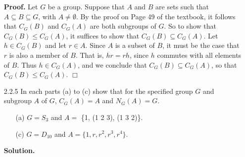 \documentclass[9pt]{article}
\newcommand{\qed}{\hfill \ensuremath{\Box}}
\begin{document}
\begin{enumerate}
      \textbf{Proof.} Let $G$ be a group. Suppose that $A$ and $B$ are sets such
      that $A \subseteq B \subseteq G$, with $A \neq \emptyset$. By the
      proof on Page 49 of the textbook, it follows that $C_G(B)$ and $C_G(A)$
      are both subgroups of $G$. So to show that $C_G(B) \le C_G(A)$, it
      suffices to show that $C_G(B) \subseteq C_G(A)$. Let $h \in C_G(B)$ and
      let $r \in A$. Since $A$ is a subset of $B$, it must be the case that
      $r$ is also a member of $B$. That is, $hr = rh$, since $h$ commutes with
      all elements of $B$. Thus $h \in C_G(A)$, and we conclude that
      $C_G(B) \subseteq C_G(A)$, so that $C_G(B) \le C_G(A)$. \qed
   \item[2.2.5]   In each parts (a) to (c) show that for the specified group $G$
                  and subgroup $A$ of $G$, $C_G(A) = A$ and $N_G(A) = G$.
                  \begin{enumerate}
                     \item[(a)]  $G = S_3$ and $A = $ \{1, (1 2 3), (1 3 2)\}.
                     \item[(c)]  $G = D_{10}$ and $A = \{1, r, r^2, r^3, r^4\}$.
                  \end{enumerate}
      
      \textbf{Solution.}
      

\end{enumerate}
\end{document}
